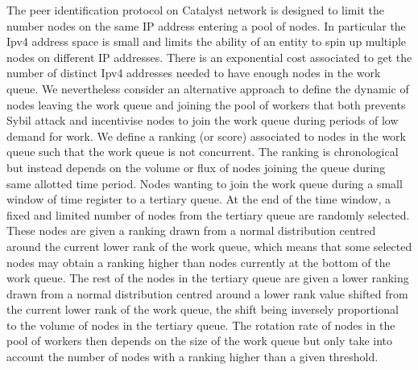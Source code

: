  The peer identification protocol on Catalyst network is designed to limit the number nodes on the same IP address entering a pool of nodes. In particular the Ipv4 address space is small and limits the ability of an entity to spin up multiple nodes on different IP addresses. There is an exponential cost associated to get the number of distinct Ipv4 addresses needed to have enough nodes in the work queue.
We nevertheless consider an alternative approach to define the dynamic of nodes leaving the work queue and joining the pool of workers that both prevents Sybil attack and incentivise nodes to join the work queue during periods of low demand for work. We define a ranking (or score) associated to nodes in the work queue such that the work queue is not concurrent. The ranking is chronological but instead depends on the volume or flux of nodes joining the queue during same allotted time period. Nodes wanting to join the work queue during a small window of time register to a tertiary queue. At the end of the time window, a fixed and limited number of nodes from the tertiary queue are randomly selected. These nodes are given a ranking drawn from a normal distribution centred around the current lower rank of the work queue, which means that some selected nodes may obtain a ranking higher than nodes currently at the bottom of the work queue. The rest of the nodes in the tertiary queue are given a lower ranking drawn from a normal distribution centred around a lower rank value shifted from the current lower rank of the work queue, the shift being inversely proportional to the volume of nodes in the tertiary queue. The rotation rate of nodes in the pool of workers then depends on the size of the work queue but only take into account the number of nodes with a ranking higher than a given threshold. 

